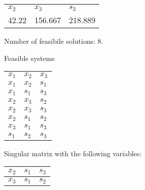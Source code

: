 \documentclass[spanish,letterpaper,11pt]{exam}
\begin{document}
\begin{questions}
\begin{solution}
        {\centering
        \begin{tabular}{lll}
          \toprule
          $x_2$ & $x_3$ & $s_3$ \\
          42.22 & 156.667 & 218.889\\ 
          \bottomrule           
        \end{tabular}
        \par
     } 
                
          Number of feasibile solutions: 8. 
          
          Feasible systems

{
  \centering
  \begin{tabular}{lll}
    \toprule
     $x_1$ & $x_2$ & $x_3$ \\
     $x_1$ & $x_2$ & $s_1$ \\
     $x_1$ & $s_1$ & $s_3$ \\
     $x_2$ & $x_3$ & $s_2$ \\
     $x_2$ & $x_3$ & $s_3$ \\
     $x_2$ & $s_1$ & $s_2$ \\
     $x_3$ & $s_1$ & $s_3$ \\
     $s_1$ & $s_2$ & $s_3$ \\
     \bottomrule
    \end{tabular}
  \par
}

   
   Singular matrix with the following variables:

   {
  \centering
  \begin{tabular}{lll}
    \toprule
     $x_2$ & $s_1$ & $s_3$ \\
     \midrule
     $x_3$ & $s_1$ & $s_2$ \\
    \bottomrule
    \end{tabular}
  \par{}
}
   \end{solution}   
\end{questions}
\end{document}

